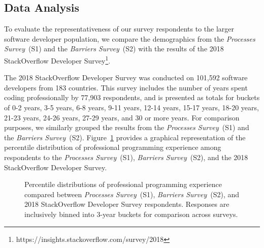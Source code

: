 \subsection{Data Analysis}\label{analysis}
To evaluate the representativeness of our survey respondents to the larger software developer population, we compare the demographics from the \textit{Processes Survey}~(S1) and the \textit{Barriers Survey}~(S2) with the results of the 2018 StackOverflow Developer Survey\footnote{https://insights.stackoverflow.com/survey/2018}.

The 2018 StackOverflow Developer Survey was conducted on 101,592 software developers from 183 countries.
This survey includes the number of years spent coding professionally by 77,903 respondents, and is presented as totals for buckets of 0-2 years, 3-5 years, 6-8 years, 9-11 years, 12-14 years, 15-17 years, 18-20 years, 21-23 years, 24-26 years, 27-29 years, and 30 or more years.
For comparison purposes, we similarly grouped the results from the \textit{Processes Survey}~(S1) and the \textit{Barriers Survey}~(S2).
Figure~\ref{populations} provides a graphical representation of the percentile distribution of professional programming experience among respondents to the \textit{Processes Survey}~(S1), \textit{Barriers Survey}~(S2), and the 2018 StackOverflow Developer Survey.

\begin{figure}[!htbp]
\centering
{}
\caption{Percentile distributions of professional programming experience compared between \textit{Processes Survey}~(S1), \textit{Barriers Survey}~(S2), and 2018 StackOverflow Developer Survey respondents. Responses are inclusively binned into 3-year buckets for comparison across surveys.}
\label{populations}
\end{figure}


